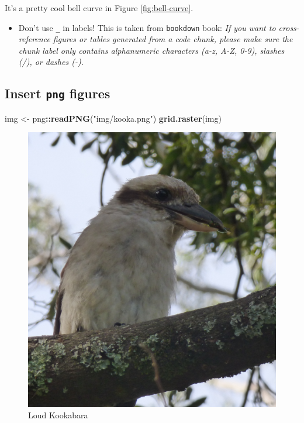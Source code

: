 \documentclass[12pt,]{article}
\newenvironment{Shaded}{\begin{snugshade}}{\end{snugshade}}
\newcommand{\KeywordTok}[1]{\textcolor[rgb]{0.13,0.29,0.53}{\textbf{#1}}}
\newcommand{\StringTok}[1]{\textcolor[rgb]{0.31,0.60,0.02}{#1}}
\newcommand{\OperatorTok}[1]{\textcolor[rgb]{0.81,0.36,0.00}{\textbf{#1}}}
\newcommand{\NormalTok}[1]{#1}
\providecommand{\tightlist}{%
  \setlength{\itemsep}{0pt}\setlength{\parskip}{0pt}}
\begin{document}
It's a pretty cool bell curve in Figure \ref{fig:bell-curve}.

\begin{itemize}
\tightlist
\item
  Don't use \texttt{\_} in labels! This is taken from \texttt{bookdown}
  book: \emph{If you want to cross-reference figures or tables generated
  from a code chunk, please make sure the chunk label only contains
  alphanumeric characters (a-z, A-Z, 0-9), slashes (/), or dashes (-).}
\end{itemize}

\subsection{\texorpdfstring{Insert \texttt{png}
figures}{Insert png figures}}\label{insert-png-figures}

\begin{Shaded}
\begin{Highlighting}[]
\NormalTok{img <-}\StringTok{ }\NormalTok{png}\OperatorTok{::}\KeywordTok{readPNG}\NormalTok{(}\StringTok{"img/kooka.png"}\NormalTok{)}
\KeywordTok{grid.raster}\NormalTok{(img)}
\end{Highlighting}
\end{Shaded}

\begin{figure}
\centering
\includegraphics{img/loud-kooka-1.pdf}
\caption{\label{fig:loud-kooka}Loud Kookabara}
\end{figure}
\end{document}
